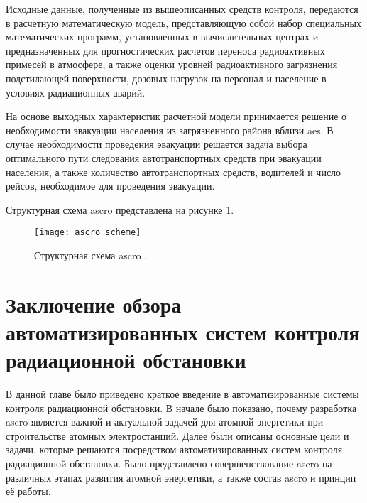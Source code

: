 Исходные данные, полученные из вышеописанных средств контроля, передаются в расчетную математическую модель,  
представляющую собой набор специальных математических программ, установленных в вычислительных центрах и предназначенных 
для прогностических расчетов переноса радиоактивных примесей в атмосфере, а также оценки уровней радиоактивного 
загрязнения подстилающей поверхности, дозовых нагрузок на персонал и население в условиях радиационных аварий.

На основе выходных характеристик расчетной модели принимается решение о необходимости эвакуации населения из 
загрязненного района вблизи \ac{aes}. В случае необходимости проведения эвакуации решается задача выбора оптимального 
пути следования автотранспортных средств при эвакуации населения, а также количество автотранспортных средств, водителей 
и число рейсов, необходимое для проведения эвакуации.

Структурная схема \ac{ascro} представлена на рисунке \ref{fig_ascro_scheme}.

\begin{figure}[ht!]
	\centering
	\texttt{[image: ascro\_scheme]}
	\captionsetup{justification=centering}
    \caption{Структурная схема \ac{ascro} \cite{elokhin}.}
    \label{fig_ascro_scheme}
\end{figure}

\section{Заключение обзора автоматизированных систем контроля радиационной обстановки}

В данной главе было приведено краткое введение в автоматизированные системы контроля радиационной обстановки. В начале 
было показано, почему разработка \ac{ascro} является важной и актуальной задачей для атомной энергетики при 
строительстве атомных электростанций. Далее были описаны основные цели и задачи, которые решаются посредством 
автоматизированных систем контроля радиационной обстановки. Было представлено совершенствование \ac{ascro} на различных 
этапах развития атомной энергетики, а также состав \ac{ascro} и принцип её работы.